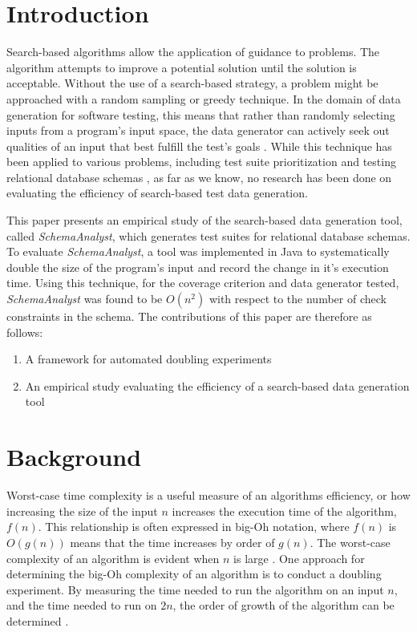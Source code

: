 \documentclass[smallextended]{svjour3}       %
\begin{document}
\section{Introduction}
Search-based algorithms allow the application of guidance to problems.
The algorithm attempts to improve a potential solution until the
solution is acceptable. Without the use of a search-based strategy, a
problem might be approached with a random sampling or greedy
technique. In the
domain of data generation for software testing, this means that rather
than randomly selecting inputs from a program's input space, the data
generator can actively seek out qualities of an input that best fulfill
the test's goals \cite{McMinn2004a}. While this
technique has been applied to various problems, including test suite
prioritization \cite{Walcott:tsp} and testing
relational database schemas \cite{Kapfhammer2013}, 
as far as we know, no research has been done on evaluating the efficiency
of search-based test data generation. 

This paper presents an empirical study of the search-based data
generation tool, called \textit{SchemaAnalyst}, which generates test suites for
relational database schemas.  To evaluate \textit{SchemaAnalyst}, a tool
was implemented in Java to systematically double the size of the
program's input and record the change in it's execution time. Using this
technique, for the coverage criterion and data generator tested, 
\textit{SchemaAnalyst} was found to be $O(n^2)$ with respect
to the number of check constraints in the schema. The contributions of
this paper are therefore as follows:
\begin{enumerate}
  \item A framework for automated doubling experiments
  \item An empirical study evaluating the efficiency of a search-based
    data generation tool
  \end{enumerate}

\section{Background}

Worst-case time complexity is a useful measure of an algorithms
efficiency, or how increasing the size
of the input $n$ increases the execution time of the algorithm, $f(n)$.
This relationship is often expressed in big-Oh notation, where $f(n)$
is $O(g(n))$ means that the time increases by order of $g(n)$. The
worst-case complexity of an algorithm is evident when $n$ is large 
\cite{Goodrich:Data}. One approach for determining the big-Oh complexity
of an algorithm is to conduct a doubling experiment. By measuring the
time needed to run the algorithm on an input $n$, and the time needed to
run on $2n$, the order of growth of the algorithm can be determined \cite{Mcgeoch:Algorithmics,
Sedgewick:Analysis}. 
\end{document}
